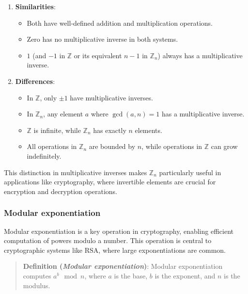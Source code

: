 \documentclass[
  letterpaper,
  DIV=11,
  numbers=noendperiod,
  oneside]{scrartcl}
\providecommand{\tightlist}{%
  \setlength{\itemsep}{0pt}\setlength{\parskip}{0pt}}\usepackage{longtable,booktabs,array}
\begin{document}
\begin{enumerate}
\def\labelenumi{\arabic{enumi}.}
\item
  \textbf{Similarities}:

  \begin{itemize}
  \tightlist
  \item
    Both have well-defined addition and multiplication operations.
  \item
    Zero has no multiplicative inverse in both systems.
  \item
    \(1\) (and \(-1\) in \(\mathbb{Z}\) or its equivalent \(n-1\) in
    \(\mathbb{Z}_n\)) always has a multiplicative inverse.
  \end{itemize}
\item
  \textbf{Differences}:

  \begin{itemize}
  \tightlist
  \item
    In \(\mathbb{Z}\), only \(±1\) have multiplicative inverses.
  \item
    In \(\mathbb{Z}_n\), any element \(a\) where \(\gcd(a,n)=1\) has a
    multiplicative inverse.
  \item
    \(\mathbb{Z}\) is infinite, while \(\mathbb{Z}_n\) has exactly \(n\)
    elements.
  \item
    All operations in \(\mathbb{Z}_n\) are bounded by \(n\), while
    operations in \(\mathbb{Z}\) can grow indefinitely.
  \end{itemize}
\end{enumerate}

This distinction in multiplicative inverses makes \(\mathbb{Z}_n\)
particularly useful in applications like cryptography, where invertible
elements are crucial for encryption and decryption operations.

\subsubsection{Modular exponentiation}\label{modular-exponentiation}

Modular exponentiation is a key operation in cryptography, enabling
efficient computation of powers modulo a number. This operation is
central to cryptographic systems like RSA, where large exponentiations
are common.

\begin{quote}
\textbf{Definition (\emph{Modular exponentiation})}: Modular
exponentiation computes \(a^b \mod n\), where \(a\) is the base, \(b\)
is the exponent, and \(n\) is the modulus.
\end{quote}
\end{document}
